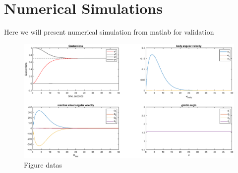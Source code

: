 \chapter{Numerical Simulations}
\label{chap:5}

Here we will present numerical simulation from matlab for validation
\begin{figure}

\includegraphics[width=1.0\textwidth]{figures/fig4}
\caption{Figure datas}
\label{fig:figd}
\end{figure}
